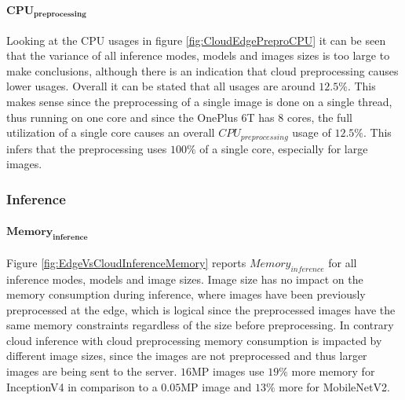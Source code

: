 \paragraph{$\mathbf{CPU_{preprocessing}}$}
Looking at the CPU usages in figure \ref{fig:CloudEdgePreproCPU} it can be seen that the variance of all inference modes, models and images sizes is too large to make conclusions, although there is an indication that cloud preprocessing causes lower usages.
Overall it can be stated that all usages are around $12.5\%$. This makes sense since the preprocessing of a single image is done on a single thread, thus running on one core and since the OnePlus 6T has 8 cores, the full utilization of a single core causes an overall $CPU_{preprocessing}$  usage of $12.5\%$. 
This infers that the preprocessing uses $100\%$ of a single core, especially for large images.





\FloatBarrier
\subsubsection{Inference}
\paragraph{$\mathbf{Memory_{inference}}$}
Figure \ref{fig:EdgeVsCloudInferenceMemory} reports $Memory_{inference}$ for all inference modes, models and image sizes.
Image size has no impact on the memory consumption during inference, where images have been previously preprocessed at the edge, which is logical since the preprocessed images have the same memory constraints regardless of the size before preprocessing.
In contrary cloud inference with cloud preprocessing memory consumption is impacted by different image sizes, since the images are not preprocessed and thus larger images are being sent to the server.
$16$MP images use $19\%$ more memory for InceptionV4 in comparison to a $0.05$MP image and $13\%$ more for MobileNetV2.

